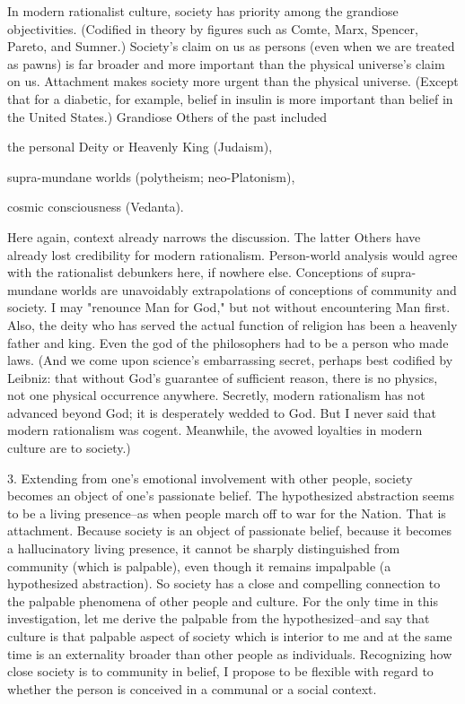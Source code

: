 In modern rationalist culture, society has priority among the grandiose objectivities. (Codified in theory by figures such as Comte, Marx, Spencer, Pareto, and Sumner.) Society's claim on us as persons (even when we are treated as pawns) is far broader and more important than the physical universe's claim on us. Attachment makes society more urgent than the physical universe. (Except that for a diabetic, for example, belief in insulin is more important than belief in the United States.) Grandiose Others of the past included

    the personal Deity or Heavenly King (Judaism),

    supra-mundane worlds (polytheism; neo-Platonism),

    cosmic consciousness (Vedanta).

Here again, context already narrows the discussion. The latter Others have already lost credibility for modern rationalism. Person-world analysis would agree with the rationalist debunkers here, if nowhere else. Conceptions of supra-mundane worlds are unavoidably extrapolations of conceptions of community and society. I may "renounce Man for God," but not without encountering Man first. Also, the deity who has served the actual function of religion has been a heavenly father and king. Even the god of the philosophers had to be a person who made laws. (And we come upon science's embarrassing secret, perhaps best codified by Leibniz: that without God's guarantee of sufficient reason, there is no physics, not one physical occurrence anywhere. Secretly, modern rationalism has not advanced beyond God; it is desperately wedded to God. But I never said that modern rationalism was cogent. Meanwhile, the avowed loyalties in modern culture are to society.)

3. Extending from one's emotional involvement with other people, society becomes an object of one's passionate belief. The hypothesized abstraction seems to be a living presence--as when people march off to war for the Nation. That is attachment. Because society is an object of passionate belief, because it becomes a hallucinatory living presence, it cannot be sharply distinguished from community (which is palpable), even though it remains impalpable (a hypothesized abstraction). So society has a close and compelling connection to the palpable phenomena of other people and culture. For the only time in this investigation, let me derive the palpable from the hypothesized--and say that culture is that palpable aspect of society which is interior to me and at the same time is an externality broader than other people as individuals. Recognizing how close society is to community in belief, I propose to be flexible with regard to whether the person is conceived in a communal or a social context.

